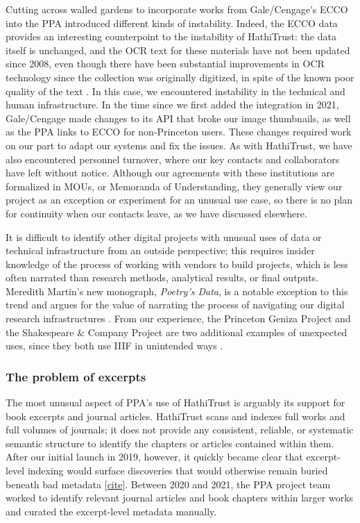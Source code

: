 \documentclass{anthology-ch}         %
\begin{document}
Cutting across walled gardens to incorporate works from Gale/Cengage’s ECCO into the PPA introduced different kinds of instability. Indeed, the ECCO data provides an interesting counterpoint to the instability of HathiTrust: the data itself is unchanged, and the OCR text for these materials have not been updated since 2008, even though there have been substantial improvements in OCR technology since the collection was originally digitized, in spite of the known poor quality of the text \cite{hill_quantifying_2019}. In this case, we encountered instability in the technical and human infrastructure. In the time since we first added the integration in 2021, Gale/Cengage made changes to its API that broke our image thumbnails, as well as the PPA links to ECCO for non-Princeton users. These changes required work on our part to adapt our systems and fix the issues. As with HathiTrust, we have also encountered personnel turnover, where our key contacts and collaborators have left without notice. Although our agreements with these institutions are formalized in MOUs, or Memoranda of Understanding, they generally view our project as an exception or experiment for an unusual use case, so there is no plan for continuity when our contacts leave, as we have discussed elsewhere\cite{naydan_beyond_2024}. 

It is difficult to identify other digital projects with unusual uses of data or technical infrastructure from an outside perspective; this requires insider knowledge of the process of working with vendors to build projects, which is less often narrated than research methods, analytical results, or final outputs. Meredith Martin’s new monograph, \textit{Poetry’s Data}, is a notable exception to this trend and argues for the value of narrating the process of navigating our digital research infrastructures \cite{martin_poetrys_2025}. From our experience, the Princeton Geniza Project and the Shakespeare \& Company Project are two additional examples of unexpected uses, since they both use IIIF in unintended ways \cite{noauthor_princeton_nodate} \cite{noauthor_shakespeare_2020}.   

\subsubsection{The problem of excerpts}

The most unusual aspect of PPA’s use of HathiTrust is arguably its support for book excerpts and journal articles. HathiTrust scans and indexes full works and full volumes of journals; it does not provide any consistent, reliable, or systematic semantic structure to identify the chapters or articles contained within them. After our initial launch in 2019, however, it quickly became clear that excerpt-level indexing would surface discoveries that would otherwise remain buried beneath bad metadata [\href{https://prosody.princeton.edu/editorial/2024/08/book-excerpts-journal-articles-and-better-metadata/}{cite}]. Between 2020 and 2021, the PPA project team worked to identify relevant journal articles and book chapters within larger works and curated the excerpt-level metadata manually. 
\end{document}
